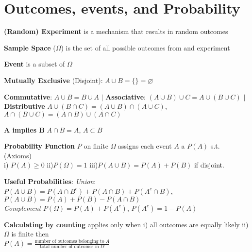 \documentclass[5pt]{article}
\begin{document}
\section{Outcomes, events, and Probability}
\begin{definition}
\textbf{(Random) Experiment} is a mechanism that results in random outcomes
\end{definition}

\begin{definition}
\textbf{Sample Space} ($\Omega$) is the set of all possible outcomes from and experiment
\end{definition}

\begin{definition}
\textbf{Event} is a subset of $\Omega$
\end{definition}

\begin{definition}
\textbf{Mutually Exclusive} (Disjoint): $A\cup B = \{\} =\varnothing$
\end{definition}

\begin{definition}
\textbf{Commutative}: $A\cup B = B \cup A$ $\vert$ \textbf{Associative}: $(A\cup B) \cup C = A \cup (B \cup C)$ $\vert$ \\
\textbf{Distributive} $A\cup (B\cap C) = (A\cup B)\cap (A\cup C)$, $A\cap (B\cup C) = (A\cap B)\cup (A\cap C)$
\end{definition}

\begin{definition}
\textbf{A implies B} $A\cap B = A$, $A\subset B$
\end{definition}

\begin{definition}
\textbf{Probability Function} $P$ on finite $\Omega$ assigns each event $A$ a $P(A)$ s.t. (Axioms) \\
i) $P(A) \geq 0$ ii)$P(\Omega) = 1$ iii)$P(A\cup B) = P(A)+P(B)$ if disjoint.
\end{definition}

\begin{definition}
\textbf{Useful Probabilities}: \emph{Union}: $P(A\cup B) = P(A\cap B^c) + P(A\cap B) + P(A^c \cap B)$, $P(A\cup B) = P(A) + P(B) - P(A\cap B)$ \\
\emph{Complement} $P(\Omega) = P(A) + P(A^c)$, $P(A^c) = 1 - P(A)$
\end{definition}

\begin{definition}
\textbf{Calculating by counting} applies only when i) all outcomes are equally likely ii) $\Omega$ is finite then \\
$P(A) = \frac{\text{number of outcomes belonging to }A}{\text{total number of outcomes in }\Omega}$
\end{definition}
\end{document}
